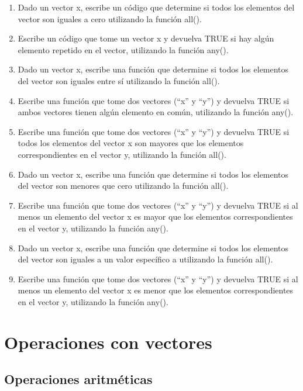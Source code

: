 \documentclass[
]{book}
\providecommand{\tightlist}{%
  \setlength{\itemsep}{0pt}\setlength{\parskip}{0pt}}
\begin{document}
\begin{enumerate}
\def\labelenumi{\arabic{enumi}.}
\tightlist
\item
  Dado un vector x, escribe un código que determine si todos los elementos del vector son iguales a cero utilizando la función all().
\item
  Escribe un código que tome un vector x y devuelva TRUE si hay algún elemento repetido en el vector, utilizando la función any().
\item
  Dado un vector x, escribe una función que determine si todos los elementos del vector son iguales entre sí utilizando la función all().
\item
  Escribe una función que tome dos vectores (``x'' y ``y'') y devuelva TRUE si ambos vectores tienen algún elemento en común, utilizando la función any().
\item
  Escribe una función que tome dos vectores (``x'' y ``y'') y devuelva TRUE si todos los elementos del vector x son mayores que los elementos correspondientes en el vector y, utilizando la función all().
\item
  Dado un vector x, escribe una función que determine si todos los elementos del vector son menores que cero utilizando la función all().
\item
  Escribe una función que tome dos vectores (``x'' y ``y'') y devuelva TRUE si al menos un elemento del vector x es mayor que los elementos correspondientes en el vector y, utilizando la función any().
\item
  Dado un vector x, escribe una función que determine si todos los elementos del vector son iguales a un valor específico a utilizando la función all().
\item
  Escribe una función que tome dos vectores (``x'' y ``y'') y devuelva TRUE si al menos un elemento del vector x es menor que los elementos correspondientes en el vector y, utilizando la función any().
\end{enumerate}

\section{Operaciones con vectores}\label{operaciones-con-vectores}

\subsection{Operaciones aritméticas}\label{operaciones-aritmuxe9ticas-1}
\end{document}
